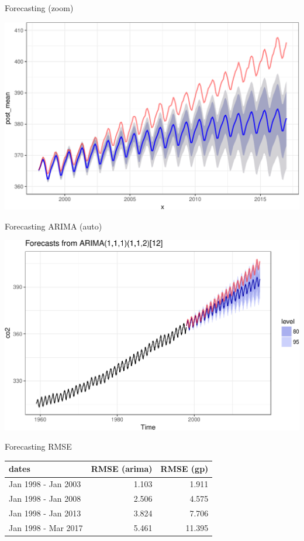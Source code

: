 \documentclass[11pt,ignorenonframetext,]{beamer}
\begin{document}
\begin{frame}{%
\protect\hypertarget{forecasting-zoom}{%
Forecasting (zoom)}}

\begin{center}\includegraphics[width=\textwidth]{Lec14_files/figure-beamer/unnamed-chunk-23-1} \end{center}

\end{frame}

\begin{frame}{%
\protect\hypertarget{forecasting-arima-auto}{%
Forecasting ARIMA (auto)}}

\begin{center}\includegraphics[width=\textwidth]{Lec14_files/figure-beamer/unnamed-chunk-24-1} \end{center}

\end{frame}

\begin{frame}{%
\protect\hypertarget{forecasting-rmse}{%
Forecasting RMSE}}

\begin{longtable}[]{@{}lrr@{}}
\toprule
dates & RMSE (arima) & RMSE (gp)\tabularnewline
\midrule
\endhead
Jan 1998 - Jan 2003 & 1.103 & 1.911\tabularnewline
Jan 1998 - Jan 2008 & 2.506 & 4.575\tabularnewline
Jan 1998 - Jan 2013 & 3.824 & 7.706\tabularnewline
Jan 1998 - Mar 2017 & 5.461 & 11.395\tabularnewline
\bottomrule
\end{longtable}

\end{frame}
\end{document}
